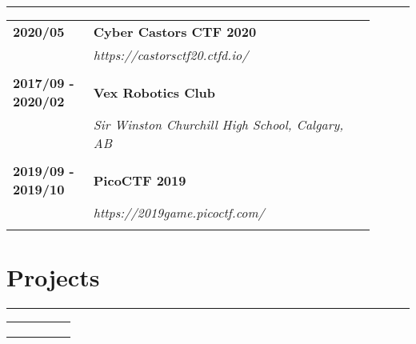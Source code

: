 \documentclass[letterpaper]{article}
\newcommand{\horizontalLine}{%
    \rule{\linewidth}{0.4pt}
    \vspace{1ex}
}
\begin{document}
        \horizontalLine

        \begin{tabular}{p{0.2\linewidth} p{0.7\linewidth}} 
            \textbf{2020/05} & \large\textbf{Cyber Castors CTF 2020} \\
            & \emph{https://castorsctf20.ctfd.io/} \\
            \\
            \textbf{2017/09 - 2020/02} & \large\textbf{Vex Robotics Club} \\
            & \emph{Sir Winston Churchill High School, Calgary, AB} \\
            \\
            \textbf{2019/09 - 2019/10} & \large\textbf{PicoCTF 2019} \\
            & \emph{https://2019game.picoctf.com/} \\
            \\
        \end{tabular}

    \section*{Projects}

        \horizontalLine

        \begin{tabular}{p{0.2\linewidth} p{0.7\linewidth}} 
            \textbf{} & \large\textbf{} \\
            & \emph{} \\
            \\
        \end{tabular}
\end{document}

